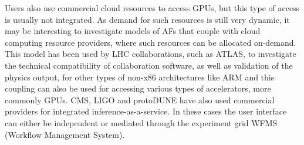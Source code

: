 Users also use commercial cloud resources to access GPUs, but this type of access is usually not integrated. As demand for such resources is still very dynamic, it may be interesting to investigate models of AFs that couple with cloud computing resource providers, where such resources can be allocated on-demand. This model has been used by LHC collaborations, such as ATLAS, to investigate the technical compatibility of collaboration software, as well as validation of the physics output, for other types of non-x86 architectures like ARM and this coupling can also be used for accessing various types of accelerators, more commonly GPUs. CMS, LIGO and protoDUNE have also used commercial providers for integrated inference-as-a-service. In these cases the user interface can either be independent or mediated through the experiment grid WFMS (Workflow Management System). 
